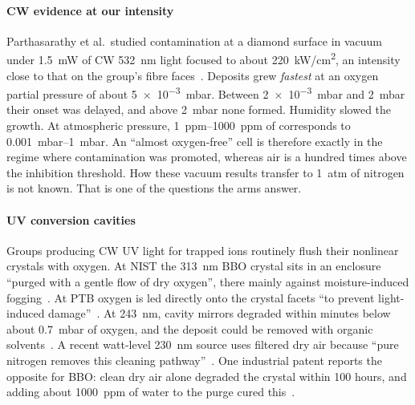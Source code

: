 \paragraph{CW evidence at our intensity} Parthasarathy et al.\ studied contamination at a diamond
surface in vacuum under \SI{1.5}{mW} of CW \SI{532}{nm} light focused to about \SI{220}{kW/cm^2}, an
intensity close to that on the group's fibre faces~\cite{Parthasarathy2024}. Deposits grew
\emph{fastest} at an oxygen partial pressure of about \SI{5e-3}{mbar}. Between \SI{2e-3}{mbar} and
\SI{2}{mbar} their onset was delayed, and above \SI{2}{mbar} none formed. Humidity slowed the growth. At
atmospheric pressure, \SIrange{1}{1000}{ppm} of \Oxy{} corresponds to \SIrange{0.001}{1}{mbar}. An
``almost oxygen-free'' cell is therefore exactly in the regime where contamination was promoted, whereas
air is a hundred times above the inhibition threshold. How these vacuum results transfer to
\SI{1}{atm} of nitrogen is not known. That is one of the questions the  arms answer.

\paragraph{UV conversion cavities} Groups producing CW UV light for trapped ions routinely flush their
nonlinear crystals with oxygen. At NIST the \SI{313}{nm} BBO crystal sits in an enclosure ``purged with a
gentle flow of dry oxygen'', there mainly against moisture-induced fogging~\cite{Wilson2011}. At PTB oxygen is led directly onto the crystal facets ``to
prevent light-induced damage''~\cite{Hannig2018}. At \SI{243}{nm}, cavity mirrors degraded within minutes
below about \SI{0.7}{mbar} of oxygen, and the deposit could be removed with organic
solvents~\cite{Cooper2018,Burkley2021}. A recent watt-level \SI{230}{nm} source uses filtered dry air
because ``pure nitrogen removes this cleaning pathway''~\cite{Cai2026}. One industrial patent reports the
opposite for BBO: clean dry air alone degraded the crystal within 100 hours, and adding about \SI{1000}{ppm}
of water to the purge cured this~\cite{KLApatent}.

